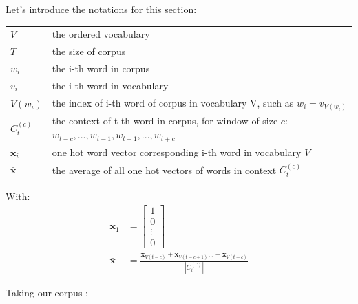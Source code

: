 Let's introduce the notations for this section:

{\ttfamily
\begin{table}[H]
    \centering
    \begin{tabular}{ll}
        \toprule
        $V$       	   	 &    the ordered vocabulary \\
        $T$    		   	 &    the size of corpus \\
        $w_i$          	 &    the i-th word in corpus \\
        $v_{i}$          	 &    the i-th word in vocabulary \\
        $V(w_i)$       &    the index of i-th word of corpus in vocabulary V, such as $ w_{i} = v_{V(w_i)}$\\
        $C_t^{(c)}$      &    the context of t-th word in corpus, for window of size $c$: $w_{t-c}, ..., w_{t-1}, w_{t+1}, ... ,w_{t+c}$\\
		$\mathbf{x}_i$ 				& one hot word vector corresponding i-th word in vocabulary $V$ \\
        $\mathbf{\bar x}$ 	& the average of all one hot vectors of words in context $C_t^{(c)}$ \\
        \bottomrule
    \end{tabular}
\end{table}
}

With:
\begin{align}
	\mathbf{x}_1 &= 
	\begin{bmatrix} 
		1 \\
		0 \\
		\vdots\\
		0
	\end{bmatrix} \\
	\mathbf{\bar x} &= \frac{\mathbf{x}_{V(t-c)} + \mathbf{x}_{V(t-c+1)} ... + \mathbf{x}_{V(t+c)}}{|C_t^{(c)}|}
\end{align}

Taking our corpus :

